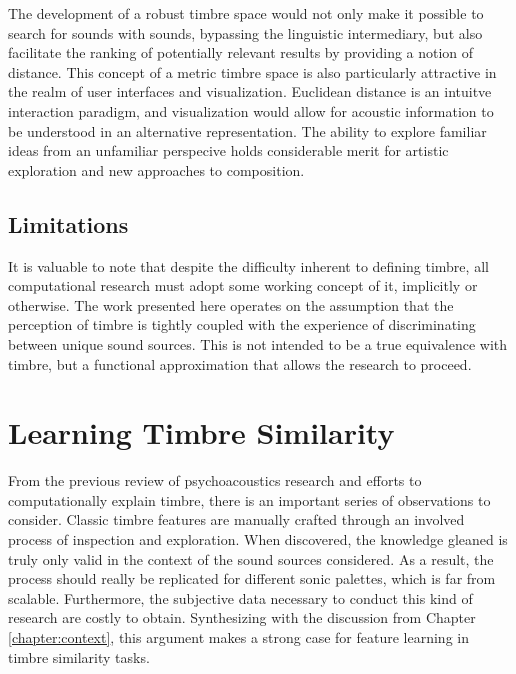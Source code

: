 The development of a robust timbre space would not only make it possible to search for sounds with sounds, bypassing the linguistic intermediary, but also facilitate the ranking of potentially relevant results by providing a notion of distance.
This concept of a metric timbre space is also particularly attractive in the realm of user interfaces and visualization.
Euclidean distance is an intuitve interaction paradigm, and visualization would allow for acoustic information to be understood in an alternative representation.
The ability to explore familiar ideas from an unfamiliar perspecive holds considerable merit for artistic exploration and new approaches to composition.



\subsection{Limitations}

It is valuable to note that despite the difficulty inherent to defining timbre, all computational research must adopt some working concept of it, implicitly or otherwise.
The work presented here operates on the assumption that the perception of timbre is tightly coupled with the experience of discriminating between unique sound sources.
This is not intended to be a true equivalence with timbre, but a functional approximation that allows the research to proceed.



\section{Learning Timbre Similarity}
\label{sec:timbre_similarity}

From the previous review of psychoacoustics research and efforts to computationally explain timbre, there is an important series of observations to consider.
Classic timbre features are manually crafted through an involved process of inspection and exploration.
When discovered, the knowledge gleaned is truly only valid in the context of the sound sources considered.
As a result, the process should really be replicated for different sonic palettes, which is far from scalable.
Furthermore, the subjective data necessary to conduct this kind of research are costly to obtain.
Synthesizing with the discussion from Chapter \ref{chapter:context}, this argument makes a strong case for feature learning in timbre similarity tasks.

